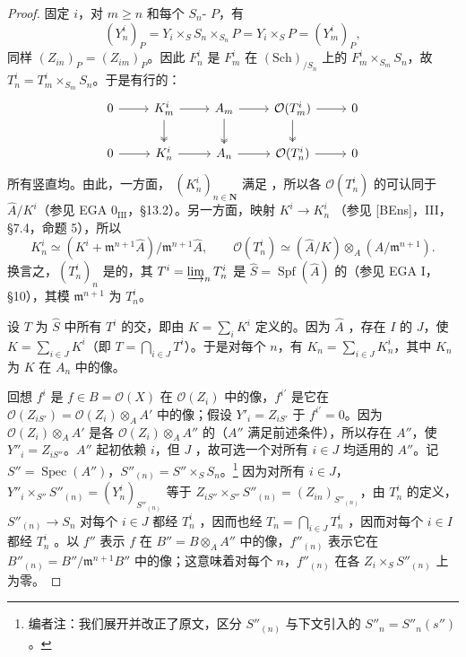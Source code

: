 \begin{proof}
固定 $i$，对 $m\geq n$ 和每个 $S_n$- $P$，有
\[(Y_n^i)_P=Y_i\times_S S_n\times_{S_n}P=Y_i\times_S P=(Y_m^i)_P,\]
同样 $(Z_{in})_P=(Z_{im})_P$。因此 $F_n^i$ 是 $F_m^i$ 在 $(\mathrm{Sch})_{/S_n}$ 上的 $F_m^i\times_{S_m}S_n$，故 $T_n^i=T_m^i\times_{S_m}S_n$。于是有行的：
\[
\begin{tikzcd}
0\arrow[r]&K_m^i\arrow[r]\arrow[d,two heads]&A_m\arrow[r]\arrow[d,two heads]&\mathcal O(T_m^i)\arrow[r]\arrow[d,two heads]&0\\
0\arrow[r]&K_n^i\arrow[r]&A_n\arrow[r]&\mathcal O(T_n^i)\arrow[r]&0
\end{tikzcd}
\]
所有竖直均。由此，一方面， $(K_n^i)_{n\in\mathbf N}$ 满足 ，所以各 $\mathcal O(T_n^i)$ 的可认同于 $\widehat A/K^i$（参见 EGA $0_{\mathrm{III}}$，\S13.2）。另一方面，映射 $K^i\to K_n^i$ （参见 [BEns]，III，\S7.4，命题 5），所以
\[K_n^i\simeq(K^i+\mathfrak m^{n+1}\widehat A)/\mathfrak m^{n+1}\widehat A,\qquad
\mathcal O(T_n^i)\simeq(\widehat A/K)\otimes_A(A/\mathfrak m^{n+1}).\]
换言之，$(T_n^i)_n$ 是的，其 $T^i=\varinjlim_nT_n^i$ 是 $\widehat S=\operatorname{Spf}(\widehat A)$ 的（参见 EGA I，\S10），其模 $\mathfrak m^{n+1}$ 为 $T_n^i$。

设 $T$ 为 $\widehat S$ 中所有 $T^i$ 的交，即由 $K=\sum_iK^i$ 定义的。因为 $\widehat A$ ，存在 $I$ 的 $J$，使 $K=\sum_{i\in J}K^i$（即 $T=\bigcap_{i\in J}T^i$）。于是对每个 $n$，有 $K_n=\sum_{i\in J}K_n^i$，其中 $K_n$ 为 $K$ 在 $A_n$ 中的像。

回想 $f^i$ 是 $f\in B=\mathcal O(X)$ 在 $\mathcal O(Z_i)$ 中的像，$f^{i'}$ 是它在 $\mathcal O(Z_{iS'})=\mathcal O(Z_i)\otimes_A A'$ 中的像；假设 $Y'_i=Z_{iS'}$ 于 $f^{i'}=0$。因为 $\mathcal O(Z_i)\otimes_A A'$ 是各 $\mathcal O(Z_i)\otimes_A A''$ 的（$A''$ 满足前述条件），所以存在 $A''$，使 $Y''_i=Z_{iS''}$。$A''$ 起初依赖 $i$，但 $J$ ，故可选一个对所有 $i\in J$ 均适用的 $A''$。记 $S''=\operatorname{Spec}(A'')$，$S''_{(n)}=S''\times_S S_n$。\footnote{编者注：我们展开并改正了原文，区分 $S''_{(n)}$ 与下文引入的 $S''_n=S''_n(s'')$。}
因为对所有 $i\in J$，$Y''_i\times_{S''}S''_{(n)}=(Y_n^i)_{S''_{(n)}}$ 等于 $Z_{iS''}\times_{S''}S''_{(n)}=(Z_{in})_{S''_{(n)}}$，由 $T_n^i$ 的定义，$S''_{(n)}\to S_n$ 对每个 $i\in J$ 都经 $T_n^i$ ，因而也经 $T_n=\bigcap_{i\in J}T_n^i$ ，因而对每个 $i\in I$ 都经 $T_n^i$ 。以 $f''$ 表示 $f$ 在 $B''=B\otimes_A A''$ 中的像，$f''_{(n)}$ 表示它在 $B''_{(n)}=B''/\mathfrak m^{n+1}B''$ 中的像；这意味着对每个 $n$，$f''_{(n)}$ 在各 $Z_i\times_S S''_{(n)}$ 上为零。


\end{proof}
